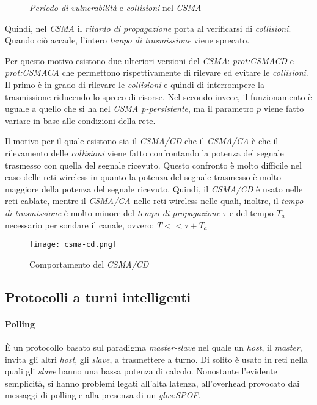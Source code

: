 \begin{figure}[h!]
    \centering
    \hfill
    \caption{\emph{Periodo di vulnerabilità} e \emph{collisioni} nel \emph{CSMA}}
\end{figure}\noindent
Quindi, nel \emph{CSMA} il \emph{ritardo di propagazione} porta al verificarsi
di \emph{collisioni}. Quando ciò accade, l'intero \emph{tempo di trasmissione}
viene sprecato.

Per questo motivo esistono due ulteriori versioni del \emph{CSMA}: \emph{
\gls{prot:CSMACD}} e \emph{\gls{prot:CSMACA}} che permettono rispettivamente di
rilevare ed evitare le \emph{collisioni}. Il primo è in grado di rilevare le
\emph{collisioni} e quindi di interrompere la trasmissione riducendo lo spreco
di risorse. Nel secondo invece, il funzionamento è uguale a quello che si ha
nel \emph{CSMA p-persistente}, ma il parametro $p$ viene fatto variare in base
alle condizioni della rete.

Il motivo per il quale esistono sia il \emph{CSMA/CD} che il \emph{CSMA/CA} è
che il rilevamento delle \emph{collisioni} viene fatto confrontando la potenza
del segnale trasmesso con quella del segnale ricevuto. Questo confronto è molto
difficile nel caso delle reti wireless in quanto la potenza del segnale trasmesso
è molto maggiore della potenza del segnale ricevuto. Quindi, il \emph{CSMA/CD}
è usato nelle reti cablate, mentre il \emph{CSMA/CA} nelle reti wireless nelle
quali, inoltre, il \emph{tempo di trasmissione} è molto minore del \emph{tempo
di propagazione} $\tau$ e del tempo $T_a$ necessario per sondare il canale,
ovvero: $T<<\tau+T_a$

\begin{figure}[h!]
    \centering
    \texttt{[image: csma-cd.png]}
    \caption{Comportamento del \emph{CSMA/CD}}
\end{figure}

\subsection{Protocolli a turni intelligenti}
\paragraph{Polling}
È un protocollo basato sul paradigma \emph{master-slave} nel quale un \emph{host},
il \emph{master}, invita gli altri \emph{host}, gli \emph{slave}, a trasmettere
a turno. Di solito è usato in reti nella quali gli \emph{slave} hanno una
bassa potenza di calcolo. Nonostante l'evidente semplicità, si hanno problemi
legati all'alta latenza, all'overhead provocato dai messaggi di polling e alla
presenza di un \emph{\gls{glos:SPOF}}.

